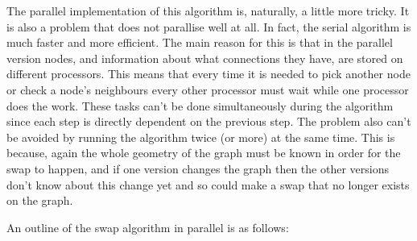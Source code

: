 \documentclass[pdftex,12pt,a4paper]{article}
\begin{document}
The parallel implementation of this algorithm is, naturally, a little more tricky. It is also a problem that does not parallise well at all. In fact, the serial algorithm is much faster and more efficient. The main reason for this is that in the parallel version nodes, and information about what connections they have, are stored on different processors. This means that every time it is needed to pick another node or check a node's neighbours every other processor must wait while one processor does the work. These tasks can't be done simultaneously during the algorithm since each step is directly dependent on the previous step. The problem also can't be avoided by running the algorithm twice (or more) at the same time. This is because, again the whole geometry of the graph must be known in order for the swap to happen, and if one version changes the graph then the other versions don't know about this change yet and so could make a swap that no longer exists on the graph.

An outline of the swap algorithm in parallel is as follows:

\end{document}
